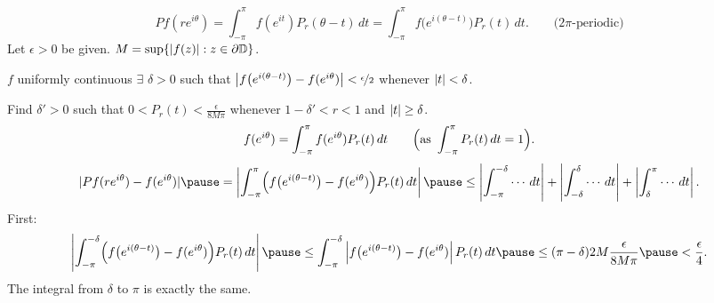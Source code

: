 \documentclass[10pt,aspectratio=169]{beamer}
\begin{document}
\begin{frame}
\[
Pf(re^{i\theta})
=
\int_{-\pi}^\pi f(e^{it}) P_r(\theta-t) \, dt
=
\int_{-\pi}^\pi f\bigl(e^{i(\theta-t)}\bigr) P_r(t) \, dt .
\qquad \text{($2\pi$-periodic)}
\]
\pause
Let $\epsilon > 0$ be given.
\pause
\quad
$M = \sup \{ \lvert {f(z)} \rvert : z \in \partial {\mathbb{D}} \}$.
\pause

$f$ uniformly continuous \pause \wthus $\exists$ $\delta > 0$
such that $\left\lvert {f\bigl(e^{i(\theta-t)}\bigr)-f(e^{i\theta})} \right\rvert <
\nicefrac{\epsilon}{2}$ whenever $\lvert {t} \rvert < \delta$.

\pause
\medskip

Find 
$\delta' > 0$ such that
\quad $0 < P_r(t) < \frac{\epsilon}{8M\pi}$ \quad
whenever
$1-\delta' < r < 1$ and $\lvert {t} \rvert \geq \delta$.
\pause
\[
f(e^{i\theta})=
\int_{-\pi}^\pi f(e^{i\theta}) P_r(t) \, dt 
\qquad \Bigl(\text{as} \ \int_{-\pi}^\pi P_r(t) \, dt = 1\Bigr).
\]
\pause
\[
\sabs{
Pf(r e^{i\theta} ) - f(e^{i\theta})
}
\pause
=
\abs{
\int_{-\pi}^{\pi} \Bigl( f\bigl(e^{i(\theta-t)}\bigr)-f(e^{i\theta}) \Bigr) P_r(t) \, dt
}
\pause
\leq 
\abs{
\int_{-\pi}^{-\delta} \cdots \, dt
}
+
\abs{
\int_{-\delta}^{\delta} \cdots \, dt
}
+
\abs{
\int_{\delta}^\pi \cdots \, dt
} .
\]
\pause
First:
\begin{equation*}
\abs{
\int_{-\pi}^{-\delta} \Bigl( f\bigl(e^{i(\theta-t)}\bigr)-f(e^{i\theta}) \Bigr) P_r(t) \, dt
}
\pause
\leq
\int_{-\pi}^{-\delta} \abs{ f\bigl(e^{i(\theta-t)}\bigr)-f(e^{i\theta}) }
P_r(t) \, dt
\pause
\leq (\pi-\delta) 2M \frac{\epsilon}{8M\pi}
\pause
< \frac{\epsilon}{4} .
\end{equation*}
\pause
The integral from $\delta$ to $\pi$ is exactly the same.
\end{frame}
\end{document}
